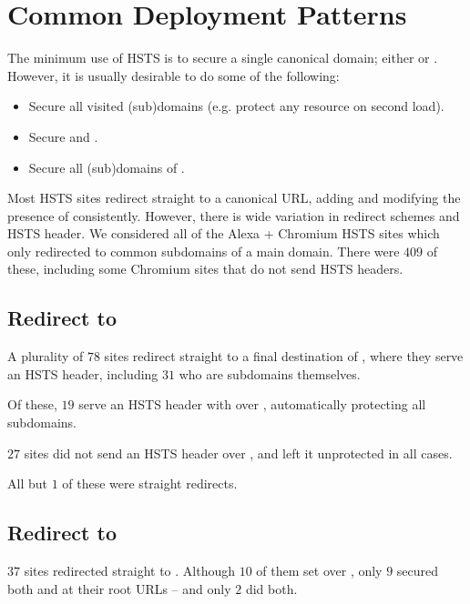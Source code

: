 \documentclass{acm_proc_article-sp}
\begin{document}
{\section{Common Deployment Patterns}

The minimum use of HSTS is to secure a single canonical domain; either {\site{\genericsite}} or {}. However, it is usually desirable to do some of the following:

\begin{itemize}
\item Secure all visited (sub)domains (e.g. protect any resource on second load).
\item Secure {\site{\genericsite}} and {}.
\item Secure all (sub)domains of {\site{\genericsite}}.
\end{itemize}

Most HSTS sites redirect straight to a canonical URL, adding  and modifying the presence of  consistently. However, there is wide variation in redirect schemes and HSTS header. We considered all of the Alexa + Chromium HSTS sites which only redirected to common subdomains of a main domain. There were $409$ of these, including some Chromium sites that do not send HSTS headers.

\subsection{Redirect to {\s}}

A plurality of $78$ sites redirect straight to a final destination of {\s}, where they serve an HSTS header, including $31$ who are subdomains themselves.

Of these, $19$ serve an HSTS header with {\iSD} over {\s}, automatically protecting all subdomains.

$27$ sites did not send an HSTS header over {\sw}, and left it unprotected in all cases.

All but $1$ of these were straight redirects.

\subsection{Redirect to {\sw}}

$37$ sites redirected straight to {\sw}. Although $10$ of them set {\iSD} over {\sw}, only $9$ secured both {\s} and {\sw} at their root URLs -- and only $2$ did both.

}
\end{document}
